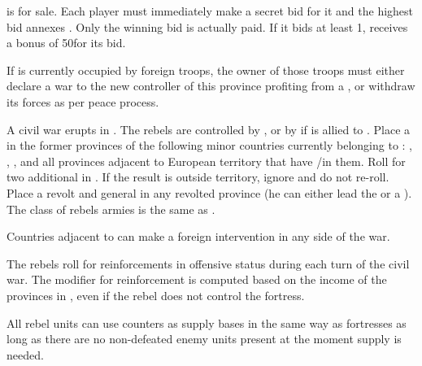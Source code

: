 


\phevnt
\aparag \provinceCorsica is for sale. Each player must immediately make a
secret bid for it and the highest bid annexes \provinceCorsica. Only the
winning bid is actually paid. If it bids at least 1\ducats, \FRA receives a
bonus of 50\ducats for its bid.

\phdipl
\aparag If \provinceCorsica is currently occupied by foreign troops, the owner
of those troops must either declare a war to the new controller of this
province profiting from a \CB, or withdraw its forces as per peace process.






\phevnt
\aparag A civil war erupts in \RUS. The rebels are controlled by \SPA, or by
\SUE if \SPA is allied to \RUS.
\aparag Place a \REVOLT \facemoins in the former provinces of the following
minor countries currently belonging to \RUS: \payskazan, \paysastrakhan,
\payssteppes, \payscrimee%
and all \ROTW provinces adjacent to \RUS European territory that have \RUS
\COL/\TP in them. Roll for two additional \REVOLT in \RUS. If the result is
outside \RUS territory, ignore and do not re-roll.
\aparag Place a revolt \ARMY\facemoins and general \leaderPugachev in any
revolted province (he can either lead the \ARMY or a \REVOLT ).
\bparag The class of rebels armies is the same as \RUS.

\phdipl
\aparag Countries adjacent to \RUS can make a foreign intervention in any side
of the war.

\phadm
\aparag The rebels roll for reinforcements in offensive status during each
turn of the civil war.
\bparag The modifier for reinforcement is computed based on the income of the
provinces in \REVOLT , even if the rebel does not control the fortress.

\phmil
\aparag All rebel units can use \REVOLT counters as supply bases in the same
way as fortresses as long as there are no non-defeated enemy units present at
the moment supply is needed.

